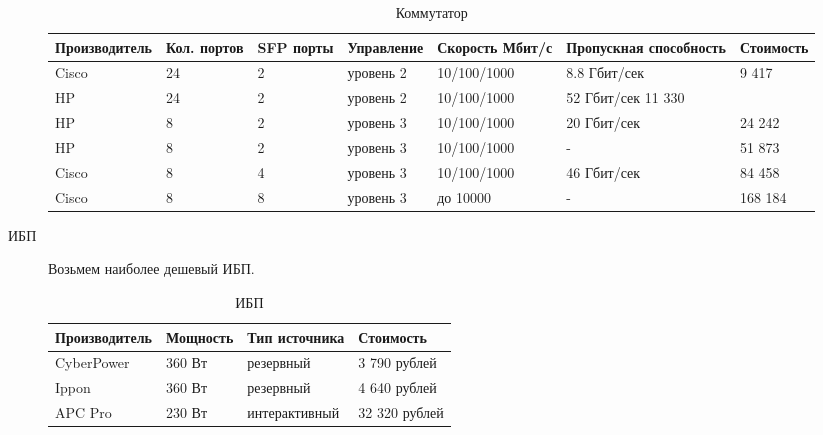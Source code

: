 \begin{description}
  \begin{table}[!htp]
    \centering
    \begin{tabular}{|l|l|l|l|l|l|l|}%
      \hline
      Производитель & Кол. портов & SFP порты & Управление & Скорость \newline Мбит/с & Пропускная способность &Стоимость \\ \hline
      Cisco & 24 & 2 & уровень 2 & 10/100/1000 & 8.8 Гбит/сек & 9 417 \\ \hline
      HP & 24 & 2 & уровень 2 & 10/100/1000 & 52 Гбит/сек 11 330 \\ \hline
      HP & 8 & 2 & уровень 3 & 10/100/1000 & 20 Гбит/сек & 24 242 \\ \hline
      HP & 8 & 2 &уровень 3 & 10/100/1000 &- & 51 873 \\ \hline
      Cisco & 8 & 4 & уровень 3 & 10/100/1000 & 46 Гбит/сек & 84 458 \\ \hline
      Cisco & 8 & 8 & уровень 3 & до 10000 & - &168 184 \\ \hline
    \end{tabular}
    \caption{Коммутатор}
    \label{table:commutator}
  \end{table}
\item[ИБП]
  Возьмем наиболее дешевый ИБП.
  \begin{table}[!htp]
    \centering
    \begin{tabular}{|l|l|l|l|}%
      \hline
      Производитель & Мощность & Тип источника &Стоимость\\ \hline
      CyberPower & 360 Вт & резервный &  3 790 рублей \\ \hline
      Ippon & 360 Вт & резервный &4 640 рублей \\ \hline
      APC Pro & 230 Вт & интерактивный & 32 320 рублей \\ \hline
    \end{tabular}
    \caption{ИБП}
    \label{table:ibp}
  \end{table}
  

\end{description}
